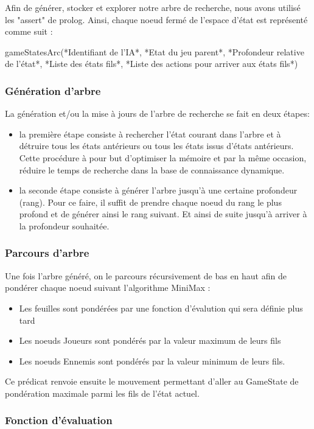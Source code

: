\documentclass[]{article}
\begin{document}
Afin de générer, stocker et explorer notre arbre de recherche, nous avons utilisé les "assert" de prolog. Ainsi, chaque noeud fermé de l'espace d'état est représenté comme suit :

	gameStatesArc(*Identifiant de l'IA*, *Etat du jeu parent*, *Profondeur relative de l'état*, *Liste des états fils*, *Liste des actions pour arriver aux états fils*)

\subsubsection{Génération d'arbre}

La génération et/ou la mise à jours de l'arbre de recherche se fait en deux étapes:
\begin{itemize}
\item la première étape consiste à rechercher l'état courant dans l'arbre et à détruire tous les états antérieurs ou tous les états issus d'états antérieurs. Cette procédure à pour but d'optimiser la mémoire et par la même occasion, réduire le temps de recherche dans la base de connaissance dynamique.
\item la seconde étape consiste à générer l'arbre jusqu'à une certaine profondeur (rang). Pour ce faire, il suffit de prendre chaque noeud du rang le plus profond et de générer ainsi le rang suivant. Et ainsi de suite jusqu'à arriver à la profondeur souhaitée.
\end{itemize}

\subsubsection{Parcours d'arbre}

Une fois l'arbre généré, on le parcours récursivement de bas en haut afin de pondérer chaque noeud suivant l'algorithme MiniMax :
\begin{itemize}
\item Les feuilles sont pondérées par une fonction d'évalution qui sera définie plus tard
\item Les noeuds Joueurs sont pondérés par la valeur maximum de leurs fils
\item Les noeuds Ennemis sont pondérés par la valeur minimum de leurs fils.
\end{itemize}

Ce prédicat renvoie ensuite le mouvement permettant d'aller au GameState de pondération maximale parmi les fils de l'état actuel.

\subsubsection{Fonction d'évaluation}
\end{document}
